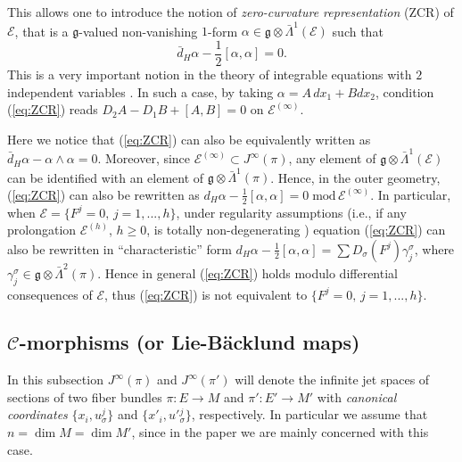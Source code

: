 \documentclass[12pt,english]{elsarticle}
\theoremstyle{plain}
\theoremstyle{plain}
\theoremstyle{remark}
\theoremstyle{plain}
\theoremstyle{definition}
\theoremstyle{definition}
\begin{document}
This allows one to introduce the notion of
\textit{zero-curvature representation} (ZCR) of ${\mathcal{E}}$, that is a
$\mathfrak{g}$-valued non-vanishing $1$-form
$\alpha \in \mathfrak{g}\otimes \bar{\Lambda}^{1}\left ({\mathcal{E}}
\right )$ such that
%
\begin{equation}
\bar{d}_{H}\alpha -\frac{1}{2}\left [\alpha ,\alpha \right ]=0.
\label{eq:ZCR}
\end{equation}
%
This is a very important notion in the theory of integrable equations with
$2$ independent variables
\cite{Ablowitz-Segur,DiegoLuiz,Dun,Taktajan,Zakharov}. In such a case,
by taking $\alpha =A\,dx_{1}+Bdx_{2}$, condition (\ref{eq:ZCR}) reads
$D_{2}A-D_{1}B+[A,B]=0$ on $\mathcal{E}^{(\infty )}$.

Here we notice that (\ref{eq:ZCR}) can also be equivalently written as
$\bar{d}_{H}\alpha -\alpha \wedge \alpha =0$. Moreover, since
$\mathcal{E}^{(\infty )}\subset J^{\infty}(\pi )$, any element of
$\mathfrak{g}\otimes \bar{\Lambda}^{1}(\mathcal{E})$ can be identified
with an element of $\mathfrak{g}\otimes \bar{\Lambda}^{1}(\pi )$. Hence,
in the outer geometry, (\ref{eq:ZCR}) can also be rewritten as
$d_{H}\alpha -\frac{1}{2}\left [\alpha ,\alpha \right ]=0\;\mbox{mod}
\,\mathcal{E}^{(\infty )}$. In particular, when
$\mathcal{E}=\{F^{j}=0,\,j=1,...,h\}$, under regularity assumptions (i.e.,
if any prolongation $\mathcal{E}^{(h )}$, $h\geq 0$, is totally non-degenerating
\cite{olver}) equation (\ref{eq:ZCR}) can also be rewritten in ``characteristic''
form
$d_{H}\alpha -\frac{1}{2}\left [\alpha ,\alpha \right ]=\sum D_{
\sigma}(F^{j})\gamma _{j}^{\sigma}$, where
$\gamma _{j}^{\sigma}\in \mathfrak{g}\otimes \bar{\Lambda}^{2}(\pi )$.
Hence in general (\ref{eq:ZCR}) holds modulo differential consequences
of $\mathcal{E}$, thus (\ref{eq:ZCR}) is not equivalent to
$\{F^{j}=0,\,j=1,...,h\}$.

\subsection{$\mathcal{C}$-morphisms (or Lie-B\"acklund maps)}
\label{subsec:morphisms}

In this subsection $J^{\infty}(\pi )$ and $J^{\infty}(\pi ')$ will denote
the infinite jet spaces of sections of two fiber bundles
$\pi :E\rightarrow M$ and $\pi ':E'\rightarrow M'$ with
\textit{canonical coordinates} $\{x_{i},u_{\sigma}^{j}\}$ and
$\{x'_{i},u'{}_{\sigma}^{j}\}$, respectively. In particular we assume that
$n=\dim M=\dim M'$, since in the paper we are mainly concerned with this
case.
\end{document}
